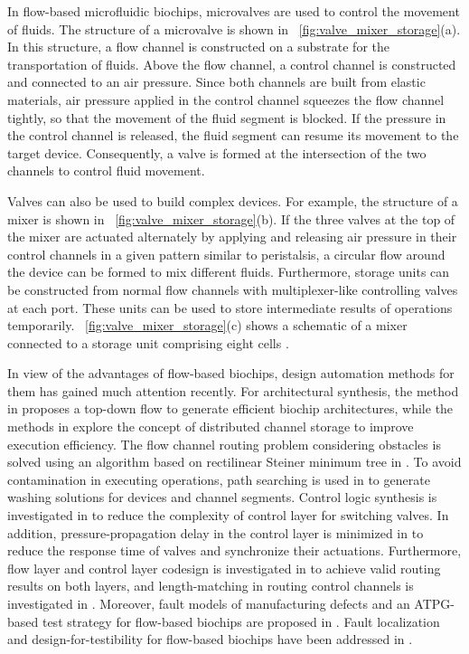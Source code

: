 \documentclass[journal,twoside]{IEEEtran}
\begin{document}
In flow-based microfluidic biochips, 
microvalves are used to control the movement of fluids.  
The structure of a microvalve
is shown in \figname~\ref{fig:valve_mixer_storage}(a).  In this structure, a
flow channel is constructed on a substrate for the transportation of fluids.
Above the flow channel, a control channel is constructed and
connected to an air pressure. Since both channels are built from
elastic materials, air pressure applied in the control channel squeezes the
flow channel tightly, so that the movement of the fluid segment is blocked.
If the pressure in the control channel is released, the fluid
segment can resume its movement to the target device. Consequently, a valve is
formed at the intersection of the two channels to control fluid movement.

Valves can also be used to build complex devices. For example, the
structure of a mixer is shown in \figname~\ref{fig:valve_mixer_storage}(b).  If
the three valves at the top of the mixer are actuated alternately by applying
and releasing air pressure in their control channels in a given pattern similar
to peristalsis, a
circular flow around the device can be formed to mix different fluids.
Furthermore, 
storage units can be constructed from normal flow channels with multiplexer-like
controlling valves at each port. These units can be used to store intermediate
results of operations temporarily.
\figname~\ref{fig:valve_mixer_storage}(c) shows a schematic of a mixer
connected to a storage unit comprising eight cells \cite{AminTA09}. 

In view of the advantages of flow-based biochips, design automation methods for
them has gained much attention recently. For architectural synthesis, 
the method in \cite{MinhassPMB12} proposes a top-down
flow to generate efficient biochip architectures, while 
the methods in \cite{TsengLSH15,Liu2017} explore the concept of
distributed channel storage to improve execution efficiency.
The flow channel routing problem considering obstacles 
is solved using an algorithm based on rectilinear Steiner minimum tree
in \cite{LinLCLH14}.
To avoid contamination in executing operations, 
path searching is used in \cite{HuHC16} to generate washing solutions for 
devices and channel segments. 
Control logic synthesis is investigated in \cite{MinhassPMH13,WZYH17,Zhu2018iccad}
to reduce the complexity of control layer for switching valves.
In addition, pressure-propagation delay in the control layer is 
minimized in  \cite{HuDHC17} to reduce the response
time of valves and synchronize their actuations.
Furthermore, flow layer and control layer codesign is investigated in
\cite{YaoWRCH15} to achieve valid routing results on both layers, and
length-matching in routing control channels is investigated in \cite{YaoHC15}.
Moreover, fault models of manufacturing defects 
and an ATPG-based test strategy for flow-based biochips are proposed
in \cite{HuYHC14,HuHC14}. 
Fault localization and design-for-testibility
for flow-based biochips have been addressed in \cite{Liu2018dac,aledate19}.
\end{document}
